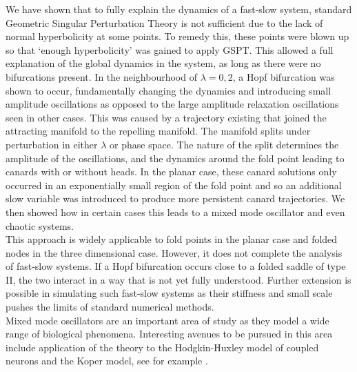 We have shown that to fully explain the dynamics of a fast-slow system, standard
Geometric Singular Perturbation Theory is not sufficient due to the lack of
normal hyperbolicity at some points. To remedy this, these points were blown up
so that `enough hyperbolicity' was gained to apply GSPT. This allowed a full
explanation of the global dynamics in the system, as long as there were no
bifurcations present. In the neighbourhood of $\lambda=0,2$, a Hopf bifurcation
was shown to occur, fundamentally changing the dynamics and introducing small
amplitude oscillations as opposed to the large amplitude relaxation oscillations
seen in other cases. This was caused by a trajectory existing that joined the
attracting manifold to the repelling manifold. The manifold splits under perturbation in either $\lambda$ or phase space. The nature of the split determines the amplitude of the oscillations, and the dynamics around the fold point leading to canards with or without heads. In the planar case, these canard solutions only occurred in an
exponentially small region of the fold point and so an additional slow variable was
introduced to produce more persistent canard trajectories. We then showed how in
certain cases this leads to a mixed mode oscillator and even chaotic systems. \\

This approach is widely applicable to fold points in the planar case and folded
nodes in the three dimensional case. However, it does not complete the analysis
of fast-slow systems. If a Hopf bifurcation occurs close to a folded saddle of type II,
the two interact in a way that is not yet fully understood. Further extension is
possible in simulating such fast-slow systems as their stiffness and small scale
pushes the limits of standard numerical methods. \\  

Mixed mode oscillators are an important area of study as they model a wide range
of biological phenomena. Interesting avenues to be pursued in this area include application of the theory to
the Hodgkin-Huxley model of coupled neurons and the Koper model, see for example \cite{MMO}.
